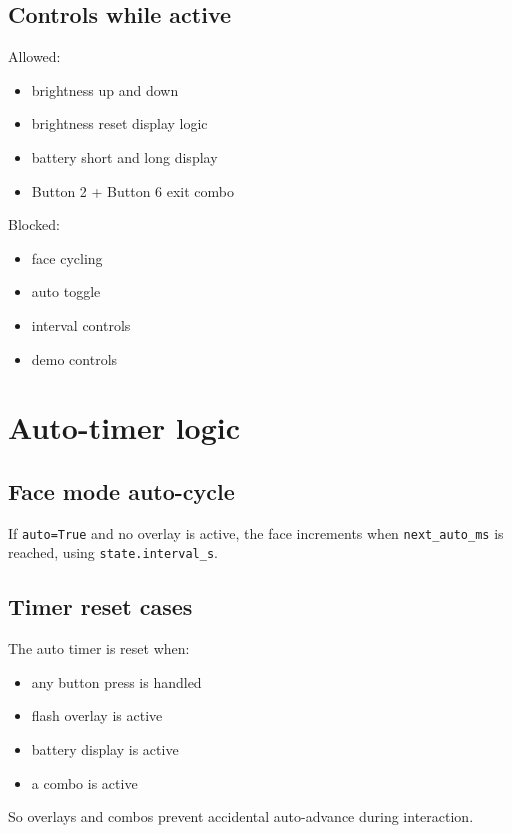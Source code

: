 \documentclass[11pt]{article}
\begin{document}
\subsection{Controls while active}
Allowed:
\begin{itemize}
  \item brightness up and down
  \item brightness reset display logic
  \item battery short and long display
  \item Button 2 + Button 6 exit combo
\end{itemize}

Blocked:
\begin{itemize}
  \item face cycling
  \item auto toggle
  \item interval controls
  \item demo controls
\end{itemize}

\section{Auto-timer logic}
\subsection{Face mode auto-cycle}
If \texttt{auto=True} and no overlay is active, the face increments when \texttt{next\_auto\_ms} is reached, using \texttt{state.interval\_s}.

\subsection{Timer reset cases}
The auto timer is reset when:
\begin{itemize}
  \item any button press is handled
  \item flash overlay is active
  \item battery display is active
  \item a combo is active
\end{itemize}

So overlays and combos prevent accidental auto-advance during interaction.
\end{document}
